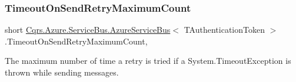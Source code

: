 \subsubsection{\texorpdfstring{Timeout\+On\+Send\+Retry\+Maximum\+Count}{TimeoutOnSendRetryMaximumCount}}
{\footnotesize\ttfamily short \hyperlink{classCqrs_1_1Azure_1_1ServiceBus_1_1AzureServiceBus}{Cqrs.\+Azure.\+Service\+Bus.\+Azure\+Service\+Bus}$<$ T\+Authentication\+Token $>$.Timeout\+On\+Send\+Retry\+Maximum\+Count\hspace{0.3cm}{\ttfamily [get]}, {\ttfamily [protected]}}



The maximum number of time a retry is tried if a System.\+Timeout\+Exception is thrown while sending messages. 

